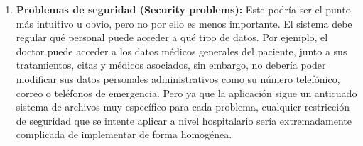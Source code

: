 \begin{enumerate}
    \item \textbf{Problemas de seguridad (Security problems):} Este podría ser el punto más intuitivo u obvio, pero no por ello es menos importante. El sistema debe regular qué personal puede acceder a qué tipo de datos. Por ejemplo, el doctor puede acceder a los datos médicos generales del paciente, junto a sus tratamientos, citas y médicos asociados, sin embargo, no debería poder modificar sus datos personales administrativos como su número telefónico, correo o teléfonos de emergencia. Pero ya que la aplicación sigue un anticuado sistema de archivos muy específico para cada problema, cualquier restricción de seguridad que se intente aplicar a nivel hospitalario sería extremadamente complicada de implementar de forma homogénea.
\end{enumerate}

